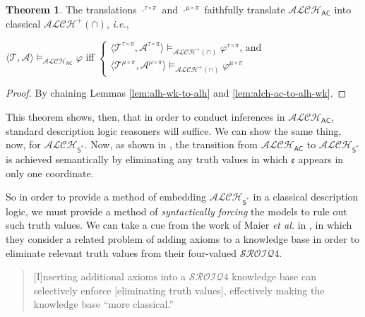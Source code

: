 \documentclass[letterpaper]{article} %
\theoremstyle{definition}
\theoremstyle{definition}
\theoremstyle{definition}
\newtheorem{theorem}{Theorem}
\theoremstyle{definition}
\theoremstyle{definition}
\begin{document}
\begin{theorem}
    The translations $\cdot^{\tau\circ \pi}$ and $\cdot^{\mu\circ \pi}$ faithfully translate $\mathcal{ALCH}_{\mathsf{AC}}$ into classical $\mathcal{ALCH}^+(\cap)$, \emph{i.e.},

    \begin{center}
        $\langle\mathcal{T},\mathcal{A}\rangle\vDash_{\mathcal{ALCH}_{\mathsf{AC}}}\varphi$  iff
        $\begin{cases}
    \langle\mathcal{T}^{\tau\circ\pi},\mathcal{A}^{\tau\circ\pi}\rangle\vDash_{\mathcal{ALCH^+(\cap)}}\varphi^{\tau\circ\pi} \mbox{, and}\\
    \langle\mathcal{T}^{\mu\circ\pi},\mathcal{A}^{\mu\circ\pi}\rangle\vDash_{\mathcal{ALCH^+(\cap)}}\varphi^{\mu\circ\pi}
    
    \end{cases}$
    \end{center}
\end{theorem}

\begin{proof}
    By chaining Lemmas \ref{lem:alh-wk-to-alh} and \ref{lem:alch-ac-to-alh-wk}.
\end{proof}

\noindent This theorem shows, then, that in order to conduct inferences in $\mathcal{ALCH}_{\mathsf{AC}}$, standard description logic reasoners will suffice. We can show the same thing, now, for $\mathcal{ALCH}_{\mathsf{S}^*}$. Now, as shown in \cite{DBLP:journals/logcom/Ferguson16}, the transition from $\mathcal{ALCH}_{\mathsf{AC}}$ to $\mathcal{ALCH}_{\mathsf{S}^{\ast}}$ is achieved semantically by eliminating any truth values in which $\mathfrak{e}$ appears in only one coordinate. 

So in order to provide a method of embedding $\mathcal{ALCH}_{\mathsf{S}^{\ast}}$ in a classical description logic, we must provide a method of \emph{syntactically forcing} the models to rule out such truth values. We can take a cue from the work of Maier \emph{et al.} in \cite{DBLP:journals/semweb/MaierMH13}, in which they consider a related problem of adding axioms to a knowledge base in order to eliminate relevant truth values from their four-valued $\mathcal{SROIQ}4$.

\begin{quote}
    [I]nserting additional axioms into a $\mathcal{SROIQ}4$ knowledge base can selectively enforce [eliminating truth values], effectively making the knowledge base ``more classical.''\cite[p.~405]{DBLP:journals/semweb/MaierMH13}
\end{quote}
\end{document}
